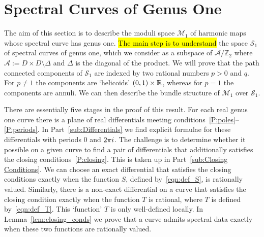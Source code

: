 \documentclass{article}
\begin{document}
\section{Spectral Curves of Genus One}\label{sec:Genus One}

The aim of this section is to describe the moduli space $\mathcal{M}_1$ of harmonic maps whose spectral curve has genus one. \hl{The main step is to understand} the space $\mathcal{S}_1$ of spectral curves of genus one, which we consider as a subspace of $\mathcal{A}/\mathbb{Z}_2$ where $\mathcal{A} := D\times D\setminus \Delta$ and $\Delta$ is the diagonal of the product. 
We will prove that the path connected components of $\mathcal{S}_1$ are indexed by two rational numbers $p > 0$ and $q$. For $p\neq 1$ the components are `helicoids' $(0,1)\times \mathbb{R}$, whereas for $p=1$ the components are annuli. We can then describe the bundle structure of $\mathcal{M}_1$ over $\mathcal{S}_1$.

There are essentially five stages in the proof of this result. 
For each real genus one curve there is a plane of real differentials meeting conditions~\ref{P:poles}--\ref{P:periods}. In Part~\ref{sub:Differentials} we find explicit formulae for these differentials with periods $0$ and $2\pi i$. 
The challenge is to determine whether it possible on a given curve to find a pair of differentials that additionally satisfies the closing conditions~\ref{P:closing}. This is taken up in Part~\ref{sub:Closing Conditions}.
We can choose an exact differential that satisfies the closing conditions exactly when the function $S$, defined by~\eqref{eqn:def_S}, is rationally valued.
Similarly, there is a non-exact differential on a curve that satisfies the closing condition exactly when the function $T$ is rational, where $T$ is defined by~\eqref{eqn:def_T}. This `function' $T$ is only well-defined locally. In Lemma~\ref{lem:closing_conds} we prove that a curve admits spectral data exactly when these two functions are rationally valued.
\end{document}
